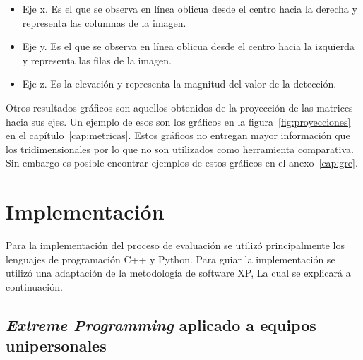 \begin{itemize}
\item Eje x. Es el que se observa en línea oblicua desde el centro hacia la derecha y representa las columnas de la imagen.
\item Eje y. Es el que se observa en línea oblicua desde el centro hacia la izquierda y representa las filas de la imagen.
\item Eje z. Es la elevación y representa la magnitud del valor de la detección.
\end{itemize}

Otros resultados gráficos son aquellos obtenidos de la proyección de las matrices hacia sus ejes. Un ejemplo de esos son los gráficos en la figura~\ref{fig:proyecciones} en el capítulo~\ref{cap:metricas}. Estos gráficos no entregan mayor información que los tridimensionales por lo que no son utilizados como herramienta comparativa. Sin embargo es posible encontrar ejemplos de estos gráficos en el anexo~\ref{cap:gre}.

\section{Implementación}

Para la implementación del proceso de evaluación se utilizó principalmente los lenguajes de programación C++ y Python. Para guiar la implementación se utilizó una adaptación de la metodología de software XP,                  La cual se explicará a continuación.

\subsection{\textit{Extreme Programming} aplicado a equipos unipersonales}

